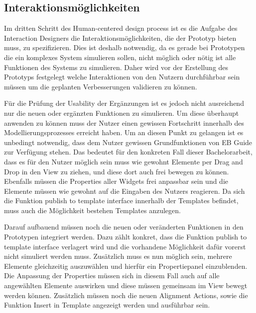 \subsection{Interaktionsmöglichkeiten}

Im dritten Schritt des Human-centered design process ist es die Aufgabe des Interaction Designers die Interaktionsmöglichkeiten, die der Prototyp bieten muss, zu spezifizieren.
Dies ist deshalb notwendig, da es gerade bei Prototypen die ein komplexes System simulieren sollen, nicht möglich oder nötig ist alle Funktionen des Systems zu simulieren.
Daher wird vor der Erstellung des Prototyps festgelegt welche Interaktionen von den Nutzern durchführbar sein müssen um die geplanten Verbesserungen validieren zu können.

Für die Prüfung der Usability der Ergänzungen ist es jedoch nicht ausreichend nur die neuen oder ergänzten Funktionen zu simulieren.
Um diese überhaupt anwenden zu können muss der Nutzer einen gewissen Fortschritt innerhalb des Modellierungsprozesses erreicht haben.
Um an diesen Punkt zu gelangen ist es unbedingt notwendig, dass dem Nutzer gewissen Grundfunktionen von EB Guide zur Verfügung stehen.
Das bedeutet für den konkreten Fall dieser Bachelorarbeit, dass es für den Nutzer möglich sein muss wie gewohnt Elemente per Drag and Drop in den View zu ziehen, und diese dort auch frei bewegen zu können.
Ebenfalls müssen die Properties aller Widgets frei anpassbar sein und die Elemente müssen wie gewohnt auf die Eingaben des Nutzers reagieren.
Da sich die Funktion \glqq publish to template interface\grqq{} innerhalb der Templates befindet, muss auch die Möglichkeit bestehen Templates anzulegen.

Darauf aufbauend müssen noch die neuen oder veränderten Funktionen in den Prototypen integriert werden.
Dazu zählt konkret, dass die Funktion \glqq publish to template interface\grqq{} verlagert wird und die vorhandene Möglichkeit dafür vorerst nicht simuliert werden muss.
Zusätzlich muss es nun möglich sein, mehrere Elemente gleichzeitig auszuwählen und hierfür ein Propertiepanel einzublenden.
Die Anpassung der Properties müssen sich in diesem Fall auch auf alle angewählten Elemente auswirken und diese müssen gemeinsam im View bewegt werden können.
Zusätzlich müssen noch die neuen Alignment Actions, sowie die Funktion \glqq Insert in Template\grqq{} angezeigt werden und ausführbar sein.


